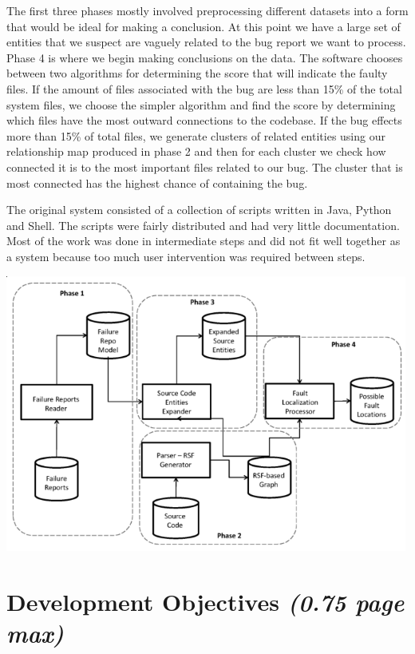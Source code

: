 \documentclass[12pt]{article}
\begin{document}
The first three phases mostly involved preprocessing different datasets
into a form that would be ideal for making a conclusion. At this point
we have a large set of entities that we suspect are vaguely related to
the bug report we want to process. Phase 4 is where we begin making
conclusions on the data. The software chooses between two algorithms for
determining the score that will indicate the faulty files. If the amount
of files associated with the bug are less than 15\% of the total system
files, we choose the simpler algorithm and find the score by determining
which files have the most outward connections to the codebase. If the
bug effects more than 15\% of total files, we generate clusters of
related entities using our relationship map produced in phase 2 and then
for each cluster we check how connected it is to the most important
files related to our bug. The cluster that is most connected has the
highest chance of containing the bug.

The original system consisted of a collection of scripts written in
Java, Python and Shell. The scripts were fairly distributed and had very
little documentation. Most of the work was done in intermediate steps
and did not fit well together as a system because too much user
intervention was required between steps.

\includegraphics[width=500px]{../images/FaultPhases}

\hypertarget{development-objectives-0.75-page-max}{%
\section{\texorpdfstring{Development Objectives \emph{(0.75 page
max)}}{Development Objectives (0.75 page max)}}\label{development-objectives-0.75-page-max}}
\end{document}
